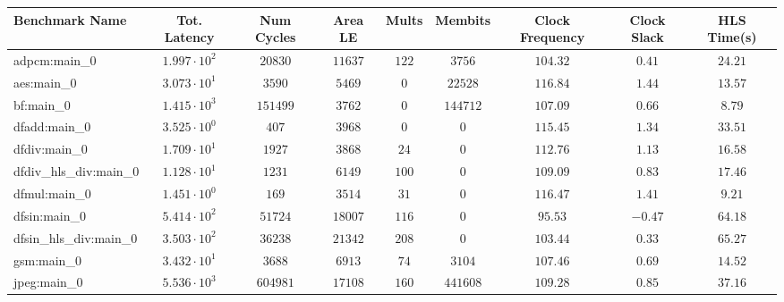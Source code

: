 \begin{tabular}{|l|c|c|c|c|c|c|c|c|}
\hline
Benchmark Name          & Tot. Latency           & Num Cycles  & Area LE    & Mults   & Membits    & Clock Frequency & Clock Slack & HLS Time(s) \\
\hline
adpcm:main\_0           & $ 1.997 \cdot 10^{2} $ & $ 20830   $ & $ 11637  $ & $ 122 $ & $ 3756   $ & $ 104.32      $ & $ 0.41    $ & $ 24.21   $ \\
aes:main\_0             & $ 3.073 \cdot 10^{1} $ & $ 3590    $ & $ 5469   $ & $ 0   $ & $ 22528  $ & $ 116.84      $ & $ 1.44    $ & $ 13.57   $ \\
bf:main\_0              & $ 1.415 \cdot 10^{3} $ & $ 151499  $ & $ 3762   $ & $ 0   $ & $ 144712 $ & $ 107.09      $ & $ 0.66    $ & $ 8.79    $ \\
dfadd:main\_0           & $ 3.525 \cdot 10^{0} $ & $ 407     $ & $ 3968   $ & $ 0   $ & $ 0      $ & $ 115.45      $ & $ 1.34    $ & $ 33.51   $ \\
dfdiv:main\_0           & $ 1.709 \cdot 10^{1} $ & $ 1927    $ & $ 3868   $ & $ 24  $ & $ 0      $ & $ 112.76      $ & $ 1.13    $ & $ 16.58   $ \\
dfdiv\_hls\_div:main\_0 & $ 1.128 \cdot 10^{1} $ & $ 1231    $ & $ 6149   $ & $ 100 $ & $ 0      $ & $ 109.09      $ & $ 0.83    $ & $ 17.46   $ \\
dfmul:main\_0           & $ 1.451 \cdot 10^{0} $ & $ 169     $ & $ 3514   $ & $ 31  $ & $ 0      $ & $ 116.47      $ & $ 1.41    $ & $ 9.21    $ \\
dfsin:main\_0           & $ 5.414 \cdot 10^{2} $ & $ 51724   $ & $ 18007  $ & $ 116 $ & $ 0      $ & $ 95.53       $ & $ -0.47   $ & $ 64.18   $ \\
dfsin\_hls\_div:main\_0 & $ 3.503 \cdot 10^{2} $ & $ 36238   $ & $ 21342  $ & $ 208 $ & $ 0      $ & $ 103.44      $ & $ 0.33    $ & $ 65.27   $ \\
gsm:main\_0             & $ 3.432 \cdot 10^{1} $ & $ 3688    $ & $ 6913   $ & $ 74  $ & $ 3104   $ & $ 107.46      $ & $ 0.69    $ & $ 14.52   $ \\
jpeg:main\_0            & $ 5.536 \cdot 10^{3} $ & $ 604981  $ & $ 17108  $ & $ 160 $ & $ 441608 $ & $ 109.28      $ & $ 0.85    $ & $ 37.16   $ \\

\end{tabular}
